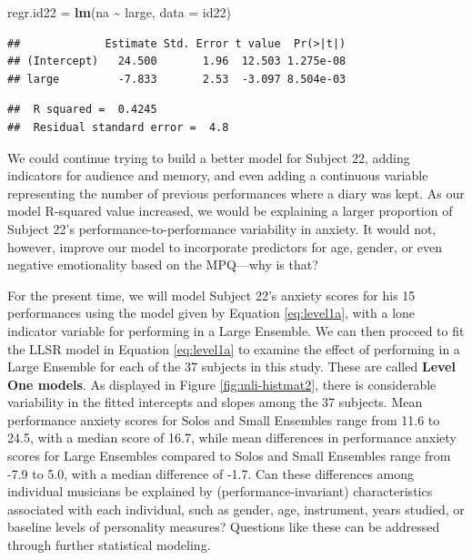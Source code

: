 \documentclass[
]{krantz}
\newenvironment{Shaded}{\begin{snugshade}}{\end{snugshade}}
\newcommand{\AttributeTok}[1]{\textcolor[rgb]{0.27,0.27,0.27}{#1}}
\newcommand{\FunctionTok}[1]{\textcolor[rgb]{0.27,0.27,0.27}{\textbf{#1}}}
\newcommand{\NormalTok}[1]{#1}
\newcommand{\OtherTok}[1]{\textcolor[rgb]{0.37,0.37,0.37}{#1}}
\newcommand{\SpecialCharTok}[1]{\textcolor[rgb]{0.43,0.43,0.43}{\textbf{#1}}}
\begin{document}
\begin{Shaded}
\begin{Highlighting}[]
\NormalTok{regr.id22 }\OtherTok{=} \FunctionTok{lm}\NormalTok{(na }\SpecialCharTok{\textasciitilde{}}\NormalTok{ large, }\AttributeTok{data =}\NormalTok{ id22)}
\end{Highlighting}
\end{Shaded}

\begin{verbatim}
##             Estimate Std. Error t value  Pr(>|t|)
## (Intercept)   24.500       1.96  12.503 1.275e-08
## large         -7.833       2.53  -3.097 8.504e-03
\end{verbatim}

\begin{verbatim}
##  R squared =  0.4245 
##  Residual standard error =  4.8
\end{verbatim}

We could continue trying to build a better model for Subject 22, adding indicators for audience and memory, and even adding a continuous variable representing the number of previous performances where a diary was kept. As our model R-squared value increased, we would be explaining a larger proportion of Subject 22's performance-to-performance variability in anxiety. It would not, however, improve our model to incorporate predictors for age, gender, or even negative emotionality based on the MPQ---why is that?

For the present time, we will model Subject 22's anxiety scores for his 15 performances using the model given by Equation \eqref{eq:level1a}, with a lone indicator variable for performing in a Large Ensemble. We can then proceed to fit the LLSR model in Equation \eqref{eq:level1a} to examine the effect of performing in a Large Ensemble for each of the 37 subjects in this study. These are called \textbf{Level One models}.  As displayed in Figure \ref{fig:mli-histmat2}, there is considerable variability in the fitted intercepts and slopes among the 37 subjects. Mean performance anxiety scores for Solos and Small Ensembles range from 11.6 to 24.5, with a median score of 16.7, while mean differences in performance anxiety scores for Large Ensembles compared to Solos and Small Ensembles range from -7.9 to 5.0, with a median difference of -1.7. Can these differences among individual musicians be explained by (performance-invariant) characteristics associated with each individual, such as gender, age, instrument, years studied, or baseline levels of personality measures? Questions like these can be addressed through further statistical modeling.
\end{document}
